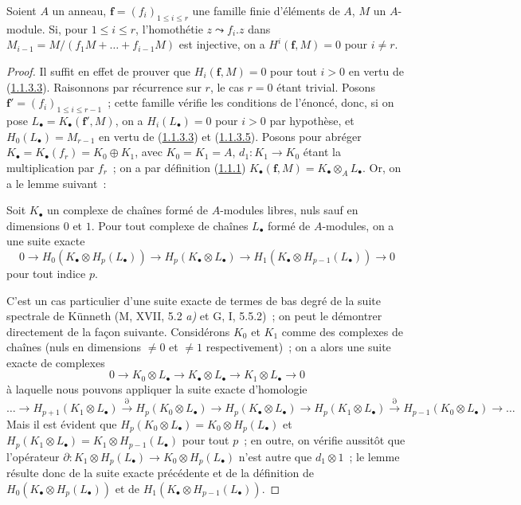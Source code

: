 \begin{proposition}[1.1.4]
\label{III.1.1.4-fr}
Soient $A$ un anneau, $\mathbf f=(f_i)_{1\leq i\leq r}$ une famille finie
d'éléments de $A$, $M$ un $A$-module. Si, pour $1\leq i\leq r$, l'homothétie
$z\leadsto f_i.z$ dans $M_{i-1}=M/(f_1M+\ldots+f_{i-1}M)$ est injective, on a
$H^i(\mathbf f,M)=0$ pour $i\neq r$.
\end{proposition}

\begin{proof}
Il suffit en effet de prouver que $H_i(\mathbf f,M)=0$ pour tout $i>0$ en
vertu de (\hyperref[III.1.1.3.3-fr]{1.1.3.3}). Raisonnons par récurrence sur
$r$, le cas $r=0$ étant trivial. Posons
$\mathbf f'=(f_i)_{1\leq i\leq r-1}$~; cette famille vérifie les conditions de
l'énoncé, donc, si on pose $L_\bullet=K_\bullet(\mathbf f',M)$, on a
$H_i(L_\bullet)=0$ pour $i>0$ par hypothèse, et
$H_0(L_\bullet)=M_{r-1}$ en vertu de
(\hyperref[III.1.1.3.3-fr]{1.1.3.3}) et
(\hyperref[III.1.1.3.5-fr]{1.1.3.5}). Posons pour abréger
$K_\bullet=K_\bullet(f_r)=K_0\oplus K_1$, avec $K_0=K_1=A$,
$d_1:K_1\to K_0$ étant la multiplication par $f_r$~; on a par définition
(\hyperref[III.1.1.1-fr]{1.1.1})
$K_\bullet(\mathbf f,M)=K_\bullet\otimes_A L_\bullet$. Or, on a le lemme
suivant~:

\begin{lemma}[1.1.4.1]
\label{III.1.1.4.1-fr}
Soit $K_\bullet$ un complexe de chaînes formé de $A$-modules libres, nuls sauf
en dimensions $0$ et $1$. Pour tout complexe de chaînes $L_\bullet$ formé de
$A$-modules, on a une suite exacte
\[
0\longrightarrow H_0(K_\bullet\otimes H_p(L_\bullet))
\longrightarrow H_p(K_\bullet\otimes L_\bullet)
\longrightarrow H_1(K_\bullet\otimes H_{p-1}(L_\bullet))
\longrightarrow0
\]
pour tout indice $p$.
\end{lemma}

C'est un cas particulier d'une suite exacte de termes de bas degré de la
suite spectrale de Künneth (M, XVII, 5.2 \emph{a)} et G, I, 5.5.2)~; on peut le
démontrer directement de la façon suivante. Considérons $K_0$ et $K_1$ comme
des complexes de chaînes (nuls en dimensions $\neq0$ et $\neq1$
respectivement)~; on a alors une suite exacte de complexes
\[
0\longrightarrow K_0\otimes L_\bullet
\longrightarrow K_\bullet\otimes L_\bullet
\longrightarrow K_1\otimes L_\bullet\longrightarrow0
\]
à laquelle nous pouvons appliquer la suite exacte d'homologie
\[
\ldots\longrightarrow H_{p+1}(K_1\otimes L_\bullet)
\xrightarrow{\partial}H_p(K_0\otimes L_\bullet)
\longrightarrow H_p(K_\bullet\otimes L_\bullet)
\longrightarrow H_p(K_1\otimes L_\bullet)
\xrightarrow{\partial}H_{p-1}(K_0\otimes L_\bullet)
\longrightarrow\ldots
\]
Mais il est évident que
$H_p(K_0\otimes L_\bullet)=K_0\otimes H_p(L_\bullet)$ et
$H_p(K_1\otimes L_\bullet)=K_1\otimes H_{p-1}(L_\bullet)$ pour tout $p$~; en
outre, on vérifie aussitôt que l'opérateur
$\partial:K_1\otimes H_p(L_\bullet)\to K_0\otimes H_p(L_\bullet)$ n'est autre
que $d_1\otimes1$~; le lemme résulte donc de la suite exacte précédente et de
la définition de $H_0(K_\bullet\otimes H_p(L_\bullet))$ et de
$H_1(K_\bullet\otimes H_{p-1}(L_\bullet))$.


\end{proof}
